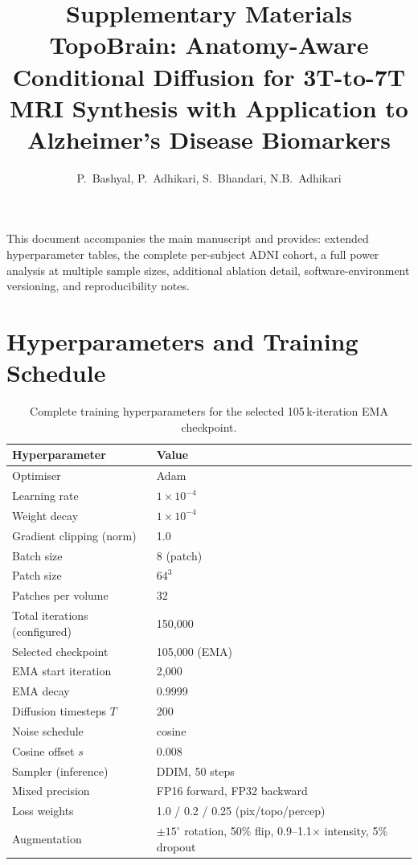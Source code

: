 \documentclass[10pt,a4paper]{article}
\title{\bfseries Supplementary Materials\\
\large TopoBrain: Anatomy-Aware Conditional Diffusion for 3T-to-7T MRI
Synthesis with Application to Alzheimer's Disease Biomarkers}
\author{P.~Bashyal, P.~Adhikari, S.~Bhandari, N.B.~Adhikari}
\date{}
\begin{document}
\maketitle
\thispagestyle{empty}

\noindent This document accompanies the main manuscript and provides:
extended hyperparameter tables, the complete per-subject ADNI cohort,
a full power analysis at multiple sample sizes, additional ablation
detail, software-environment versioning, and reproducibility notes.

\section{Hyperparameters and Training Schedule}

\begin{table}[!ht]
\caption{Complete training hyperparameters for the selected
105\,k-iteration EMA checkpoint.}
\centering
\small
\begin{tabular}{ll}
\toprule
Hyperparameter & Value \\
\midrule
Optimiser                 & Adam \\
Learning rate             & $1\times10^{-4}$ \\
Weight decay              & $1\times10^{-4}$ \\
Gradient clipping (norm)  & 1.0 \\
Batch size                & 8 (patch) \\
Patch size                & $64^3$ \\
Patches per volume        & 32 \\
Total iterations (configured) & 150{,}000 \\
Selected checkpoint       & 105{,}000 (EMA) \\
EMA start iteration       & 2{,}000 \\
EMA decay                 & 0.9999 \\
Diffusion timesteps $T$   & 200 \\
Noise schedule            & cosine \cite{ho2020denoising} \\
Cosine offset $s$         & 0.008 \\
Sampler (inference)       & DDIM, 50 steps \\
Mixed precision           & FP16 forward, FP32 backward \\
Loss weights              & 1.0 / 0.2 / 0.25 (pix/topo/percep) \\
Augmentation              & $\pm 15^\circ$ rotation, 50\% flip, 0.9–1.1$\times$ intensity, 5\% dropout \\
\bottomrule
\end{tabular}
\end{table}
\end{document}
